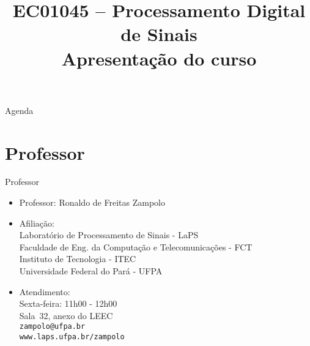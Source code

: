 


\title{\Large EC01045 -- Processamento Digital de Sinais\\ \vspace{1cm}Apresentação do curso}


   \maketitle[randomdots={false}]
   \begin{slide}{Agenda}
      \tableofcontents[content=sections]
   \end{slide}

   \section[ slide = false ]{Professor }
      \begin{slide}[toc=]{Professor}
         \begin{itemize}
            \item Professor: Ronaldo de Freitas Zampolo
            \item Afiliação:\\
                  Laboratório de Processamento de Sinais - LaPS\\
                  Faculdade de Eng. da Computação e Telecomunicações - FCT\\
                  Instituto de Tecnologia - ITEC\\
                  Universidade Federal do Pará - UFPA
            \item Atendimento:\\
                  Sexta-feira: 11h00 - 12h00\\
                  Sala~32, anexo do LEEC\\
                  \texttt{zampolo@ufpa.br}\\ 
                  \texttt{www.laps.ufpa.br/zampolo}
         \end{itemize}
      \end{slide}
      
